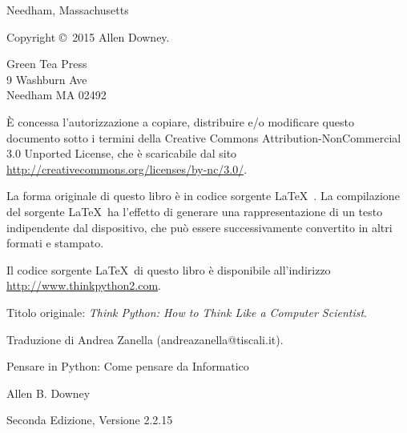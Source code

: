 \documentclass[10pt]{book}
\newcommand{\thetitle}{Pensare in Python: Come pensare da Informatico}
\newcommand{\theversion}{Seconda Edizione, Versione 2.2.15}
\newcommand{\thedate}{}
\begin{document}
\begin{latexonly}
\begin{flushright}
{\small Needham, Massachusetts}

\vfill

\end{flushright}


\pagebreak
\thispagestyle{empty}

{\small
Copyright \copyright ~2015 Allen Downey.


\vspace{0.2in}

\begin{flushleft}
Green Tea Press       \\
9 Washburn Ave        \\
Needham MA 02492
\end{flushleft}

È concessa l'autorizzazione a copiare, distribuire e/o modificare questo documento sotto i termini della Creative Commons Attribution-NonCommercial 3.0 Unported License, che è scaricabile dal sito \url{http://creativecommons.org/licenses/by-nc/3.0/}.

La forma originale di questo libro è in codice sorgente \LaTeX\ . La compilazione del sorgente \LaTeX\ ha l'effetto di generare una rappresentazione di un testo indipendente dal dispositivo, che può essere successivamente convertito in altri formati e stampato.

Il codice sorgente \LaTeX\ di questo libro è disponibile all'indirizzo
\url{http://www.thinkpython2.com}.

\vspace{0.2in}
Titolo originale: {\em Think Python: How to Think Like a Computer Scientist}.

Traduzione di Andrea Zanella (andreazanella@tiscali.it).


\vspace{0.2in}

} %

\end{latexonly}



\begin{htmlonly}


{\Large \thetitle}

{\large Allen B. Downey}

\theversion

\thedate

\setcounter{chapter}{-1}

\end{htmlonly}
\end{document}

